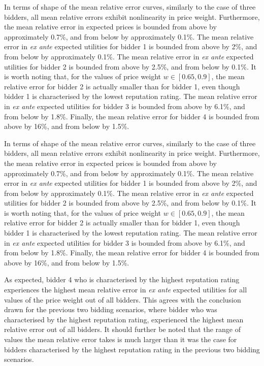 In terms of shape of the mean relative error curves, similarly to the case of three bidders, all mean relative errors exhibit nonlinearity in price weight. Furthermore, the mean relative error in expected prices is bounded from above by approximately 0.7\%, and from below by approximately 0.1\%. The mean relative error in \emph{ex ante} expected utilities for bidder 1 is bounded from above by 2\%, and from below by approximately 0.1\%. The mean relative error in \emph{ex ante} expected utilities for bidder 2 is bounded from above by 2.5\%, and from below by 0.1\%. It is worth noting that, for the values of price weight $w\in [0.65, 0.9]$, the mean relative error for bidder 2 is actually smaller than for bidder 1, even though bidder 1 is characterised by the lowest reputation rating. The mean relative error in \emph{ex ante} expected utilities for bidder 3 is bounded from above by 6.1\%, and from below by 1.8\%. Finally, the mean relative error for bidder 4 is bounded from above by 16\%, and from below by 1.5\%.

In terms of shape of the mean relative error curves, similarly to the case of three bidders, all mean relative errors exhibit nonlinearity in price weight. Furthermore, the mean relative error in expected prices is bounded from above by approximately 0.7\%, and from below by approximately 0.1\%. The mean relative error in \emph{ex ante} expected utilities for bidder 1 is bounded from above by 2\%, and from below by approximately 0.1\%. The mean relative error in \emph{ex ante} expected utilities for bidder 2 is bounded from above by 2.5\%, and from below by 0.1\%. It is worth noting that, for the values of price weight $w\in [0.65, 0.9]$, the mean relative error for bidder 2 is actually smaller than for bidder 1, even though bidder 1 is characterised by the lowest reputation rating. The mean relative error in \emph{ex ante} expected utilities for bidder 3 is bounded from above by 6.1\%, and from below by 1.8\%. Finally, the mean relative error for bidder 4 is bounded from above by 16\%, and from below by 1.5\%.

As expected, bidder 4 who is characterised by the highest reputation rating experiences the highest mean relative error in \emph{ex ante} expected utilities for all values of the price weight out of all bidders. This agrees with the conclusion drawn for the previous two bidding scenarios, where bidder who was characterised by the highest reputation rating, experienced the highest mean relative error out of all bidders. It should further be noted that the range of values the mean relative error takes is much larger than it was the case for bidders characterised by the highest reputation rating in the previous two bidding scenarios.

